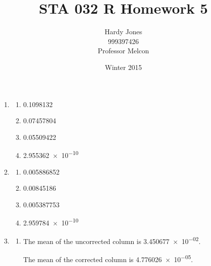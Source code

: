 \documentclass[12pt,letterpaper]{article}
\title{STA 032 R Homework 5\vspace{-2ex}}
\author{Hardy Jones\\
        999397426\\
        Professor Melcon\vspace{-2ex}}
\date{Winter 2015}
\begin{document}
  \maketitle


  \begin{enumerate}
    \item
      \begin{enumerate}
        \item \num{0.1098132}
        \item \num{0.07457804}
        \item \num{0.05509422}
        \item \num{2.955362e-10}
      \end{enumerate}
    \item
      \begin{enumerate}
        \item \num{0.005886852}
        \item \num{0.00845186}
        \item \num{0.005387753}
        \item \num{2.959784e-10}
      \end{enumerate}
    \item
      \begin{enumerate}
        \item
          The mean of the uncorrected column is \num{3.450677e-02}.

          The mean of the corrected column is \num{4.776026e-05}.


\end{enumerate}
\end{enumerate}
\end{document}

